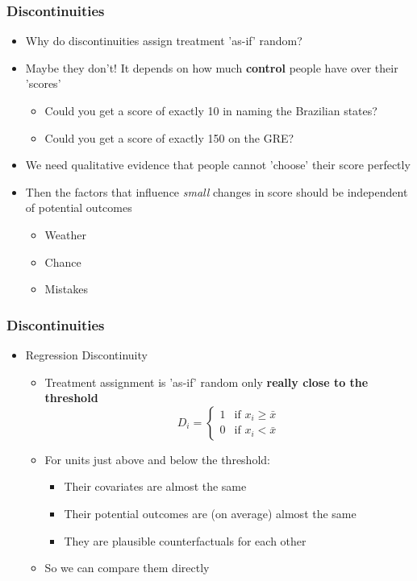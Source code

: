 \documentclass[xcolor=x11names,compress]{beamer}\usepackage[]{graphicx}\usepackage[]{color}
\renewcommand{\(}{\begin{columns}}
\renewcommand{\)}{\end{columns}}
\newcommand{\<}[1]{\begin{column}{#1}}
\renewcommand{\>}{\end{column}}
\begin{document}
\begin{frame}
\frametitle{Discontinuities}
\begin{itemize}
\item Why do discontinuities assign treatment 'as-if' random?
\pause
\item Maybe they don't! \pause It depends on how much \textbf{control} people have over their 'scores'
\pause
\begin{itemize}
\item Could you get a score of exactly 10 in naming the Brazilian states?
\pause
\item Could you get a score of exactly 150 on the GRE?
\end{itemize}
\pause
\item We need qualitative evidence that people cannot 'choose' their score perfectly
\pause
\item Then the factors that influence \textit{small} changes in score should be independent of potential outcomes
\begin{itemize}
\item Weather
\item Chance
\item Mistakes
\end{itemize}
\end{itemize}
\end{frame}

\begin{frame}
\frametitle{Discontinuities}
\begin{itemize}
\item Regression Discontinuity
\begin{itemize}
\item Treatment assignment is 'as-if' random only \textbf{really close to the threshold}
\pause
\[
D_i=
\begin{cases}
1 & \text{if }x_i \geq \bar{x} \\
0 & \text{if }x_i < \bar{x}
\end{cases}
\]
\pause
\item For units just above and below the threshold:
\begin{itemize}
\item Their covariates are almost the same
\item Their potential outcomes are (on average) almost the same
\item They are plausible counterfactuals for each other
\end{itemize}
\pause
\item So we can compare them directly
\end{itemize}
\end{itemize}
\end{frame}
\end{document}

